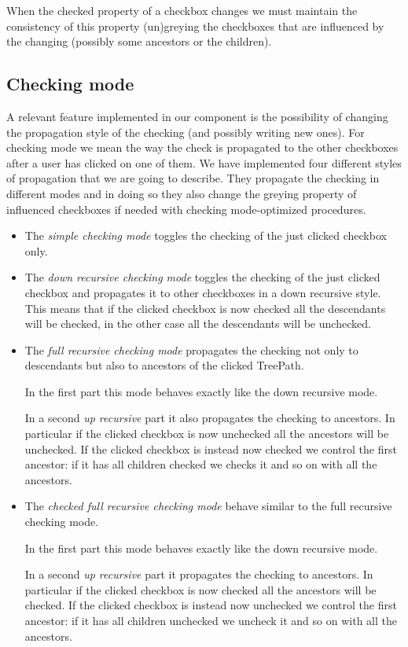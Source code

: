 \documentclass[twocolumn,desyfonts,twoside]{desypaper}  %
\begin{document}
When the checked property of a checkbox changes we must maintain the
consistency of this property (un)greying the checkboxes that are
influenced by the changing (possibly some ancestors or the
children).

\subsection{Checking mode}
A relevant feature implemented in our component is the possibility
of changing the propagation style of the checking (and possibly
writing new ones). For checking mode we mean the way the check is
propagated to the other checkboxes after a user has clicked on one
of them. We have implemented four different styles of propagation
that we are going to describe. They propagate the checking in
different modes and in doing so they also change the greying
property of influenced checkboxes if needed with checking
mode-optimized procedures.
\begin{itemize}

\item
The \emph{simple checking mode} toggles the checking of the just
clicked checkbox only.

\item
The \emph{down recursive checking mode} toggles the checking of the
just clicked checkbox and propagates it to other checkboxes in a
down recursive style. This means that if the clicked checkbox is now
checked all the descendants will be checked, in the other case all
the descendants will be unchecked.

\item
The \emph{full recursive checking mode} propagates the checking not
only to descendants but also to ancestors of the clicked TreePath.

In the first part this mode behaves exactly like the down recursive
mode.

In a second \emph{up recursive} part it also propagates the checking
to ancestors. In particular if the clicked checkbox is now unchecked
all the ancestors will be unchecked. If the clicked checkbox is
instead now checked we control the first ancestor: if it has all
children checked we checks it and so on with all the ancestors.

\item
The \emph{checked full recursive checking mode} behave similar to
the full recursive checking mode.

In the first part this mode behaves exactly like the down recursive
mode.

In a second \emph{up recursive} part it propagates the checking to
ancestors. In particular if the clicked checkbox is now checked all
the ancestors will be checked. If the clicked checkbox is instead
now unchecked we control the first ancestor: if it has all children
unchecked we uncheck it and so on with all the ancestors.

\end{itemize}
\end{document}
